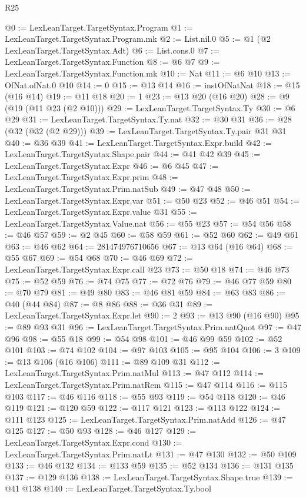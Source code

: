 \begin{lexlean}{R25}
\begin{coremodule}
@0 := LexLeanTarget.TargetSyntax.Program
@1 := LexLeanTarget.TargetSyntax.Program.mk
@2 := List.nil.{0}
@5 := @1 (@2 LexLeanTarget.TargetSyntax.Adt)
@6 := List.cons.{0}
@7 := LexLeanTarget.TargetSyntax.Function
@8 := @6 @7
@9 := LexLeanTarget.TargetSyntax.Function.mk
@10 := Nat
@11 := @6 @10
@13 := OfNat.ofNat.{0} @10
@14 := 0
@15 := @13 @14
@16 := instOfNatNat
@18 := @15 (@16 @14)
@19 := @11 @18
@20 := 1
@23 := @13 @20 (@16 @20)
@28 := @9 (@19 (@11 @23 (@2 @10)))
@29 := LexLeanTarget.TargetSyntax.Ty
@30 := @6 @29
@31 := LexLeanTarget.TargetSyntax.Ty.nat
@32 := @30 @31
@36 := @28 (@32 (@32 (@2 @29)))
@39 := LexLeanTarget.TargetSyntax.Ty.pair @31 @31
@40 := @36 @39
@41 := LexLeanTarget.TargetSyntax.Expr.build
@42 := LexLeanTarget.TargetSyntax.Shape.pair
@44 := @41 @42 @39
@45 := LexLeanTarget.TargetSyntax.Expr
@46 := @6 @45
@47 := LexLeanTarget.TargetSyntax.Expr.prim
@48 := LexLeanTarget.TargetSyntax.Prim.natSub
@49 := @47 @48
@50 := LexLeanTarget.TargetSyntax.Expr.var
@51 := @50 @23
@52 := @46 @51
@54 := LexLeanTarget.TargetSyntax.Expr.value @31
@55 := LexLeanTarget.TargetSyntax.Value.nat
@56 := @55 @23
@57 := @54 @56
@58 := @46 @57
@59 := @2 @45
@60 := @58 @59
@61 := @52 @60
@62 := @49 @61
@63 := @46 @62
@64 := 281474976710656
@67 := @13 @64 (@16 @64)
@68 := @55 @67
@69 := @54 @68
@70 := @46 @69
@72 := LexLeanTarget.TargetSyntax.Expr.call @23
@73 := @50 @18
@74 := @46 @73
@75 := @52 @59
@76 := @74 @75
@77 := @72 @76
@79 := @46 @77 @59
@80 := @70 @79
@81 := @49 @80
@83 := @46 @81 @59
@84 := @63 @83
@86 := @40 (@44 @84)
@87 := @8 @86
@88 := @36 @31
@89 := LexLeanTarget.TargetSyntax.Expr.let
@90 := 2
@93 := @13 @90 (@16 @90)
@95 := @89 @93 @31
@96 := LexLeanTarget.TargetSyntax.Prim.natQuot
@97 := @47 @96
@98 := @55 @18
@99 := @54 @98
@101 := @46 @99 @59
@102 := @52 @101
@103 := @74 @102
@104 := @97 @103
@105 := @95 @104
@106 := 3
@109 := @13 @106 (@16 @106)
@111 := @89 @109 @31
@112 := LexLeanTarget.TargetSyntax.Prim.natMul
@113 := @47 @112
@114 := LexLeanTarget.TargetSyntax.Prim.natRem
@115 := @47 @114
@116 := @115 @103
@117 := @46 @116
@118 := @55 @93
@119 := @54 @118
@120 := @46 @119
@121 := @120 @59
@122 := @117 @121
@123 := @113 @122
@124 := @111 @123
@125 := LexLeanTarget.TargetSyntax.Prim.natAdd
@126 := @47 @125
@127 := @50 @93
@128 := @46 @127
@129 := LexLeanTarget.TargetSyntax.Expr.cond
@130 := LexLeanTarget.TargetSyntax.Prim.natLt
@131 := @47 @130
@132 := @50 @109
@133 := @46 @132
@134 := @133 @59
@135 := @52 @134
@136 := @131 @135
@137 := @129 @136
@138 := LexLeanTarget.TargetSyntax.Shape.true
@139 := @41 @138
@140 := LexLeanTarget.TargetSyntax.Ty.bool

\end{coremodule}
\end{lexlean}
